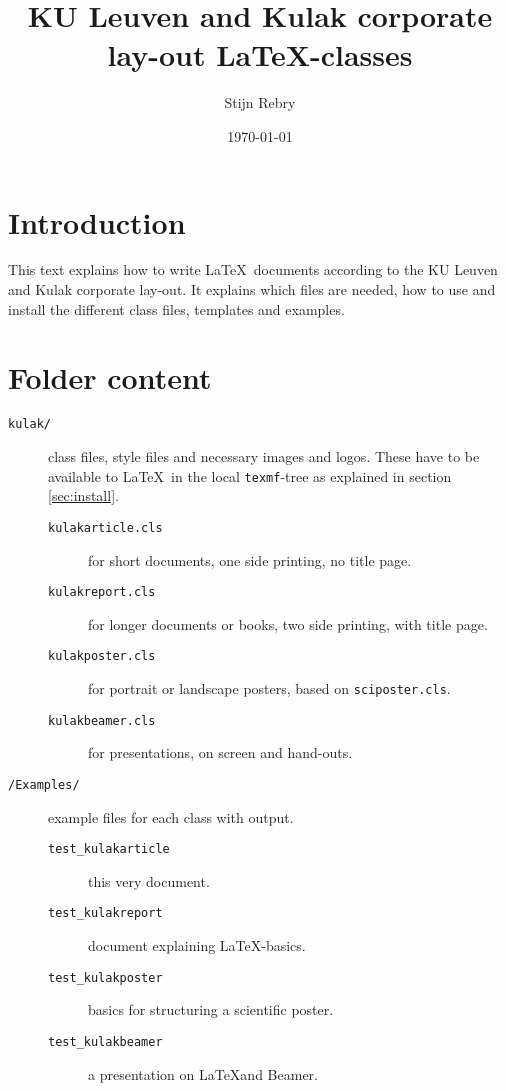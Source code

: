 \documentclass[kulak]{kulakarticle} %
\title{KU Leuven and Kulak corporate lay-out \LaTeX-classes}
\author{Stijn Rebry}
\date{\today}
\begin{document}
\maketitle

\section*{Introduction}
This text explains how to write \LaTeX\ documents according to the KU Leuven and Kulak corporate lay-out.
It explains which files are needed, how to use and install the different class files, templates and examples.

\section{Folder content}
\begin{description}
\item[\texttt{kulak/}] class files, style files and necessary images and logos. These have to be available to \LaTeX\ in the local \texttt{texmf}-tree as explained in section \ref{sec:install}.
\begin{description}
\item[\texttt{kulakarticle.cls}]  for short documents, one side printing, no title page.
\item[\texttt{kulakreport.cls}]  for longer documents or books, two side printing, with title page.
\item[\texttt{kulakposter.cls}]  for portrait or landscape posters, based on \texttt{sciposter.cls}.
\item[\texttt{kulakbeamer.cls}]  for presentations, on screen and hand-outs.
\end{description}
\item[\texttt{/Examples/}] example files for each class with output. 
\begin{description}
\item[\texttt{test\_kulakarticle}]  this very document.
\item[\texttt{test\_kulakreport}]  document explaining \LaTeX-basics.
\item[\texttt{test\_kulakposter}]  basics for structuring a scientific poster.
\item[\texttt{test\_kulakbeamer}]  a presentation on \LaTeX and Beamer.

\end{description}
\end{description}
\end{document}
